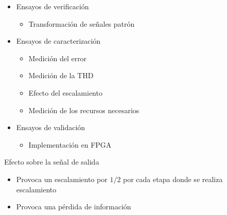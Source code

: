 \begin{frame}{}
  \begin{itemize}
    \item<1-> Ensayos de verificación
    \begin{itemize}
      \Fontitit
      \item<1-> Transformación de señales patrón
    \end{itemize}
    \item<1-> Ensayos de caracterización
    \begin{itemize}
      \Fontitit
      \item<1-> Medición del error
      \item<1-> Medición de la THD
      \item<1-> Efecto del escalamiento
      \item<1-> Medición de los recursos necesarios 
    \end{itemize}
    \item<1-> Ensayos de validación
    \begin{itemize}
      \Fontitit
      \item<1-> Implementación en FPGA
    \end{itemize}
  \end{itemize}
\end{frame}

\begin{frame}{Efecto sobre la señal de salida}
  \begin{itemize}
    \item<1-> Provoca un escalamiento por $1/2$ por cada etapa donde se realiza escalamiento
    \item<2-> Provoca una pérdida de información
  \end{itemize}
  
\end{frame}

